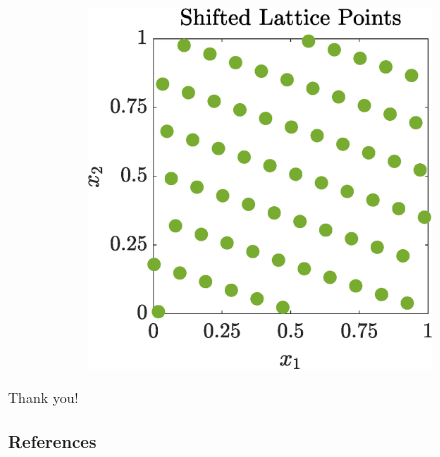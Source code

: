 \documentclass[10pt,compress,xcolor={usenames,dvipsnames}]{beamer} %
\begin{document}
{\begin{figure}[htp]
\begin{subfigure}[b]{0.35\textwidth}
    \end{subfigure}
    \centering
    \begin{subfigure}[b]{0.35\textwidth}
    \includegraphics[width=\textwidth]{figures/ShiftedLatticePoints}
    \end{subfigure}
\end{figure}
}
\fi


\begin{frame}[plain,c]

\begin{center}
\Huge Thank you!
\end{center}

\end{frame}


\begin{frame}[allowframebreaks]\frametitle{References}
	{}
\end{frame}
\end{document}
